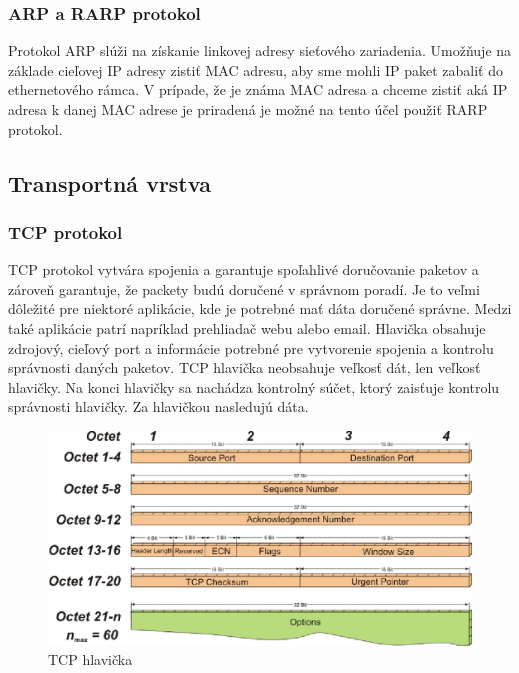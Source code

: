 \documentclass[10pt,a4paper,final]{article}
\begin{document}
\subsubsection{ARP a RARP protokol}
Protokol ARP slúži na získanie linkovej adresy sieťového zariadenia. Umožňuje na základe cieľovej IP adresy zistiť MAC adresu, aby sme mohli IP paket zabaliť do ethernetového rámca. V prípade, že je známa MAC adresa a chceme zistiť aká IP adresa k danej MAC adrese je priradená je možné na tento účel použiť RARP protokol\cite{arp}.

\subsection{Transportná vrstva}
\subsubsection{TCP protokol}
TCP protokol vytvára spojenia a garantuje spoľahlivé doručovanie paketov a zároveň garantuje, že packety budú doručené v správnom poradí. Je to veľmi dôležité pre niektoré aplikácie, kde je potrebné mať dáta doručené správne. Medzi také aplikácie patrí napríklad prehliadač webu alebo email. Hlavička obsahuje zdrojový, cieľový port a informácie potrebné pre vytvorenie spojenia a kontrolu správnosti daných paketov. TCP hlavička neobsahuje veľkosť dát, len veľkosť hlavičky. Na konci hlavičky sa nachádza kontrolný súčet, ktorý zaisťuje kontrolu správnosti hlavičky. Za hlavičkou nasledujú dáta.

\begin{figure}[H]
	\centering
	\includegraphics[scale=0.63, keepaspectratio]{images/tcp.eps}
	\caption{TCP hlavička\cite{ipv6-img}}
\end{figure}
\end{document}
